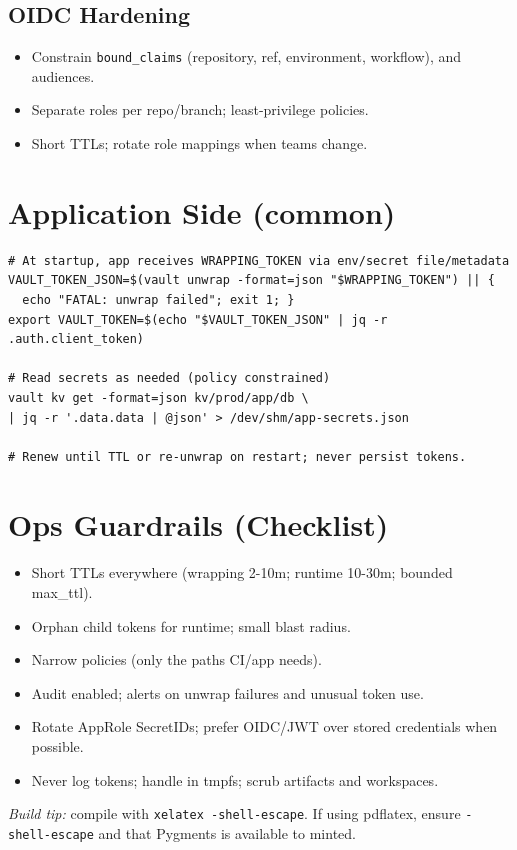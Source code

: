\documentclass[11pt,letterpaper]{article}
\begin{document}
\subsection*{OIDC Hardening}
\begin{itemize}[leftmargin=1.25em]
  \item Constrain \texttt{bound\_claims} (repository, ref, environment, workflow), and audiences.
  \item Separate roles per repo/branch; least-privilege policies.
  \item Short TTLs; rotate role mappings when teams change.
\end{itemize}
\clearpage

\section*{Application Side (common)}
\begin{verbatim}
# At startup, app receives WRAPPING_TOKEN via env/secret file/metadata
VAULT_TOKEN_JSON=$(vault unwrap -format=json "$WRAPPING_TOKEN") || {
  echo "FATAL: unwrap failed"; exit 1; }
export VAULT_TOKEN=$(echo "$VAULT_TOKEN_JSON" | jq -r .auth.client_token)

# Read secrets as needed (policy constrained)
vault kv get -format=json kv/prod/app/db \
| jq -r '.data.data | @json' > /dev/shm/app-secrets.json

# Renew until TTL or re-unwrap on restart; never persist tokens.
\end{verbatim}

\section*{Ops Guardrails (Checklist)}
\begin{itemize}[leftmargin=1.25em]
  \item Short TTLs everywhere (wrapping 2-10m; runtime 10-30m; bounded max\_ttl).
  \item Orphan child tokens for runtime; small blast radius.
  \item Narrow policies (only the paths CI/app needs).
  \item Audit enabled; alerts on unwrap failures and unusual token use.
  \item Rotate AppRole SecretIDs; prefer OIDC/JWT over stored credentials when possible.
  \item Never log tokens; handle in tmpfs; scrub artifacts and workspaces.
\end{itemize}

\vfill
\noindent\textit{Build tip:} compile with \texttt{xelatex -shell-escape}. If using pdflatex, ensure \texttt{-shell-escape} and that Pygments is available to minted.
\end{document}
